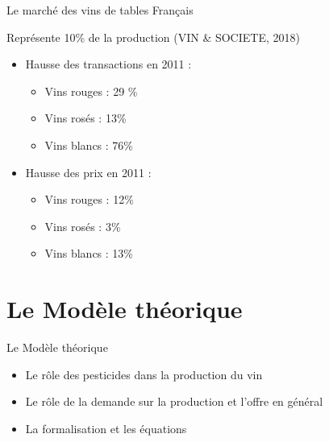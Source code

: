 \documentclass[11pt,ignorenonframetext,]{beamer}
\providecommand{\tightlist}{%
  \setlength{\itemsep}{0pt}\setlength{\parskip}{0pt}}
\begin{document}
\begin{frame}{Le marché des vins de tables Français}
\protect\hypertarget{le-marche-des-vins-de-tables-francais}{}

Représente 10\% de la production (VIN \& SOCIETE, 2018)

\begin{itemize}
\tightlist
\item
  Hausse des transactions en 2011 :

  \begin{itemize}
  \tightlist
  \item
    Vins rouges : 29 \%
  \item
    Vins rosés : 13\%
  \item
    Vins blancs : 76\%
  \end{itemize}
\item
  Hausse des prix en 2011 :

  \begin{itemize}
  \tightlist
  \item
    Vins rouges : 12\%
  \item
    Vins rosés : 3\%
  \item
    Vins blancs : 13\%
  \end{itemize}
\end{itemize}

\end{frame}

\hypertarget{le-modele-theorique}{%
\section{Le Modèle théorique}\label{le-modele-theorique}}

\begin{frame}{Le Modèle théorique}
\protect\hypertarget{le-modele-theorique-1}{}

\begin{itemize}
\tightlist
\item
  Le rôle des pesticides dans la production du vin
\item
  Le rôle de la demande sur la production et l'offre en général
\item
  La formalisation et les équations
\end{itemize}

\end{frame}
\end{document}
